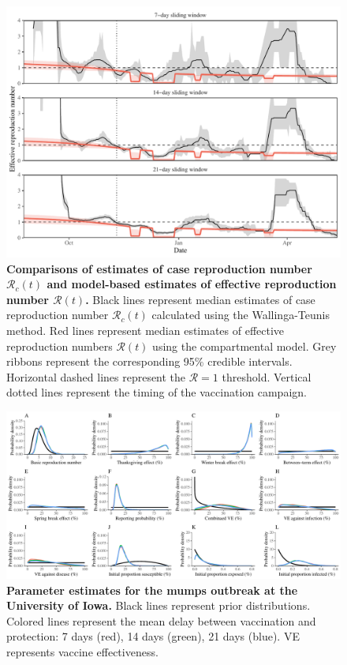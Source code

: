 \documentclass[12pt]{article}
\begin{document}
\pagebreak

\begin{figure}[!h]
\includegraphics[width=\textwidth]{../figure_stanfit_seirv_final/figure_stanfit_Rt_comp.pdf}
\caption{
\textbf{Comparisons of estimates of case reproduction number $\mathcal R_c(t)$ and model-based estimates of effective reproduction number $\mathcal R(t)$.}
Black lines represent median estimates of case reproduction number $\mathcal R_c(t)$ calculated using the Wallinga-Teunis method.
Red lines represent median estimates of effective reproduction numbers $\mathcal R(t)$ using the compartmental model.
Grey ribbons represent the corresponding 95\% credible intervals.
Horizontal dashed lines represent the $\mathcal R=1$ threshold.
Vertical dotted lines represent the timing of the vaccination campaign.
}
\end{figure}

\pagebreak 

\begin{figure}[!h]
\includegraphics[width=\textwidth]{../figure_stanfit_seirv_final/figure_stanfit_param_all.pdf}
\caption{
\textbf{Parameter estimates for the mumps outbreak at the University of Iowa.}
Black lines represent prior distributions.
Colored lines represent the mean delay between vaccination and protection: 7 days (red), 14 days (green), 21 days (blue).
VE represents vaccine effectiveness.
}
\label{fig:param}
\end{figure}
\end{document}
